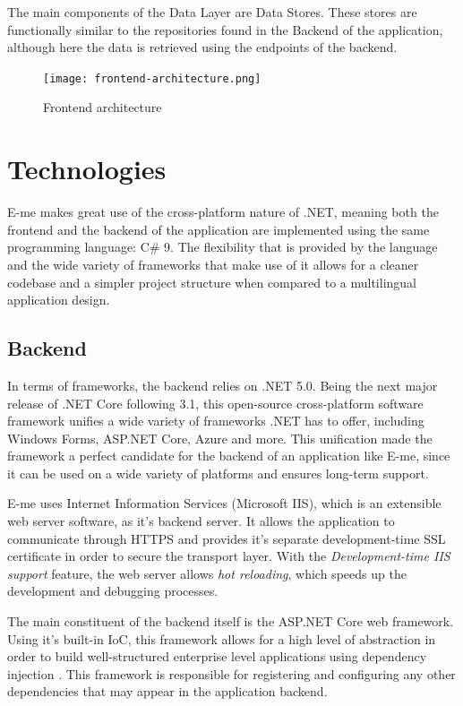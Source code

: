 The main components of the Data Layer are Data Stores.
These stores are functionally similar to the repositories found in the Backend of the application, although here the data is retrieved using the endpoints
of the backend.

\begin{figure}[H]
	\centering
	\texttt{[image: frontend-architecture.png]}
	\caption{Frontend architecture}
\end{figure}


\section{Technologies}

E-me makes great use of the cross-platform nature of .NET, meaning both the frontend and the backend of the application are implemented using the same
programming language: C\# 9.
The flexibility that is provided by the language and the wide variety of frameworks that make use of it allows for a cleaner codebase and a simpler
project structure when compared to a multilingual application design.

\subsection{Backend}

In terms of frameworks, the backend relies on .NET 5.0. Being the next major release of .NET Core following 3.1, this open-source cross-platform
software framework unifies a wide variety of frameworks .NET has to offer, including Windows Forms, ASP.NET Core, Azure and more.
This unification made the framework a perfect candidate for the backend of an application like E-me, since it can be used on a wide variety of
platforms and ensures long-term support.

E-me uses Internet Information Services (Microsoft IIS), which is an extensible web server software, as it's backend server.
It allows the application to communicate through HTTPS and provides it's separate development-time SSL certificate in order to secure the transport
layer. With the \emph{Development-time IIS support} feature, the web server allows \emph{hot reloading}, which speeds up the development and debugging
processes.

The main constituent of the backend itself is the ASP.NET Core web framework.
Using it's built-in IoC, this framework allows for a high level of abstraction in order to build well-structured enterprise level applications
using dependency injection \cite{seemann2012dependency} \cite{joshi2019asp}.
This framework is responsible for registering and configuring any other dependencies that may appear in the application backend.

